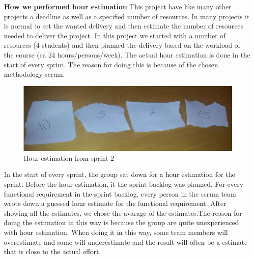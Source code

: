 	{\bf How we performed hour estimation} This project have like many other projects a deadline
	as well as a specified number of resources. In many projects it is normal to set the wanted 
	delivery and then estimate the number of resources needed to deliver the project.
	In this project we started with a number of resources (4 students) and then planned the 
	delivery based on the workload of the course (ca 24 hours/persons/week). The actual 
	hour estimation is done in the start of every sprint. The reason for doing this is because of 
	the chosen methodology scrum.

	\begin{figure}[H]
		\includegraphics[width=1.0\textwidth]{pictures/estimation.jpg}
		\caption{Hour estimation from sprint 2}
	\end{figure}

	In the start of every sprint, the group sat down for a hour estimation for the sprint.
	Before the hour estimation, it the sprint backlog was planned. For every functional requirement
	in the sprint backlog, every person in the scrum team wrote down a guessed hour estimate
	for the functional requirement. After showing all the estimates, we chose the avarage of
	the estimates.The reason for doing the estimation in this way is because the group 
	are quite unexperienced with hour estimation. When doing it in this way, some team 
	members will overestimate and some will underestimate and the result will often be a estimate that is close to the actual effort. 
